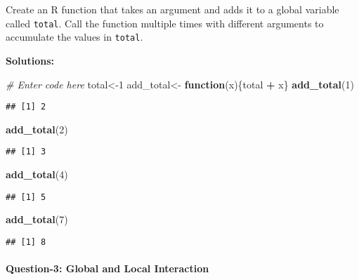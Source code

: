 \documentclass[
]{article}
\newenvironment{Shaded}{\begin{snugshade}}{\end{snugshade}}
\newcommand{\CommentTok}[1]{\textcolor[rgb]{0.56,0.35,0.01}{\textit{#1}}}
\newcommand{\ControlFlowTok}[1]{\textcolor[rgb]{0.13,0.29,0.53}{\textbf{#1}}}
\newcommand{\DecValTok}[1]{\textcolor[rgb]{0.00,0.00,0.81}{#1}}
\newcommand{\FunctionTok}[1]{\textcolor[rgb]{0.13,0.29,0.53}{\textbf{#1}}}
\newcommand{\NormalTok}[1]{#1}
\newcommand{\OtherTok}[1]{\textcolor[rgb]{0.56,0.35,0.01}{#1}}
\newcommand{\SpecialCharTok}[1]{\textcolor[rgb]{0.81,0.36,0.00}{\textbf{#1}}}
\begin{document}
Create an R function that takes an argument and adds it to a global
variable called \texttt{total}. Call the function multiple times with
different arguments to accumulate the values in \texttt{total}.

\textbf{Solutions:}

\begin{Shaded}
\begin{Highlighting}[]
\CommentTok{\# Enter code here}
\NormalTok{total}\OtherTok{\textless{}{-}}\DecValTok{1}
\NormalTok{add\_total}\OtherTok{\textless{}{-}} \ControlFlowTok{function}\NormalTok{(x)\{total }\SpecialCharTok{+}\NormalTok{ x\}}
\FunctionTok{add\_total}\NormalTok{(}\DecValTok{1}\NormalTok{)}
\end{Highlighting}
\end{Shaded}

\begin{verbatim}
## [1] 2
\end{verbatim}

\begin{Shaded}
\begin{Highlighting}[]
\FunctionTok{add\_total}\NormalTok{(}\DecValTok{2}\NormalTok{)}
\end{Highlighting}
\end{Shaded}

\begin{verbatim}
## [1] 3
\end{verbatim}

\begin{Shaded}
\begin{Highlighting}[]
\FunctionTok{add\_total}\NormalTok{(}\DecValTok{4}\NormalTok{)}
\end{Highlighting}
\end{Shaded}

\begin{verbatim}
## [1] 5
\end{verbatim}

\begin{Shaded}
\begin{Highlighting}[]
\FunctionTok{add\_total}\NormalTok{(}\DecValTok{7}\NormalTok{)}
\end{Highlighting}
\end{Shaded}

\begin{verbatim}
## [1] 8
\end{verbatim}

\hypertarget{question-3-global-and-local-interaction}{%
\paragraph{Question-3: Global and Local
Interaction}\label{question-3-global-and-local-interaction}}
\end{document}

